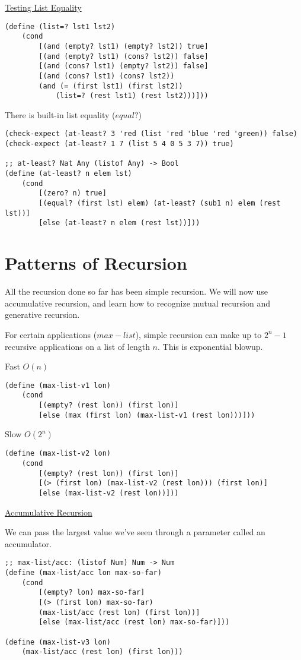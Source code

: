 \documentclass{article}
\begin{document}
\underline{Testing List Equality}

\begin{lstlisting}
(define (list=? lst1 lst2)
    (cond
        [(and (empty? lst1) (empty? lst2)) true]
        [(and (empty? lst1) (cons? lst2)) false]
        [(and (cons? lst1) (empty? lst2)) false]
        [(and (cons? lst1) (cons? lst2))
        (and (= (first lst1) (first lst2))
            (list=? (rest lst1) (rest lst2)))]))
\end{lstlisting}

There is built-in list equality ($equal?$)

\begin{lstlisting}
(check-expect (at-least? 3 'red (list 'red 'blue 'red 'green)) false)
(check-expect (at-least? 1 7 (list 5 4 0 5 3 7)) true)

;; at-least? Nat Any (listof Any) -> Bool
(define (at-least? n elem lst)
    (cond
        [(zero? n) true]
        [(equal? (first lst) elem) (at-least? (sub1 n) elem (rest lst))]
        [else (at-least? n elem (rest lst))]))
\end{lstlisting}

\section{Patterns of Recursion}

All the recursion done so far has been simple recursion. We will now use accumulative recursion, and learn how to recognize mutual recursion and generative recursion. 

For certain applications ($max-list$), simple recursion can make up to $2^n-1$ recursive applications on a list of length $n$. This is exponential blowup. 

Fast $O(n)$
\begin{lstlisting}
(define (max-list-v1 lon)
    (cond
        [(empty? (rest lon)) (first lon)]
        [else (max (first lon) (max-list-v1 (rest lon)))]))
\end{lstlisting}

Slow $O(2^n)$
\begin{lstlisting}
(define (max-list-v2 lon)
    (cond
        [(empty? (rest lon)) (first lon)]
        [(> (first lon) (max-list-v2 (rest lon))) (first lon)]
        [else (max-list-v2 (rest lon))]))
\end{lstlisting}

\underline{Accumulative Recursion}

We can pass the largest value we've seen through a parameter called an accumulator. 
\begin{lstlisting}
;; max-list/acc: (listof Num) Num -> Num
(define (max-list/acc lon max-so-far)
    (cond
        [(empty? lon) max-so-far]
        [(> (first lon) max-so-far)
        (max-list/acc (rest lon) (first lon))]
        [else (max-list/acc (rest lon) max-so-far)]))

(define (max-list-v3 lon)
    (max-list/acc (rest lon) (first lon)))
\end{lstlisting}
\end{document}
